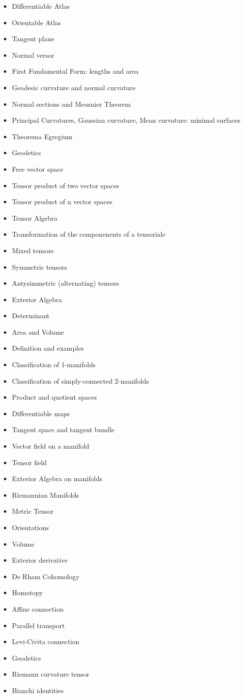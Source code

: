 \documentclass[10pt]{article}
\begin{document}
\begin{itemize}
	\item Differentiable Atlas
	\item Orientable Atlas
	\item Tangent plane
	\item Normal versor
	\item First Fundamental Form: lengths and area
	\item Geodesic curvature and normal curvature
	\item Normal sections and Meusnier Theorem
	\item Principal Curvatures, Gaussian curvature, Mean curvature: minimal surfaces
	\item Theorema Egregium
	\item Geodetics
	\item Free vector space
	\item Tensor product of two vector spaces
	\item Tensor product of n vector spaces
	\item Tensor Algebra
	\item Transformation of the componenents of a tensoriale
	\item Mixed tensors
	\item Symmetric tensors
	\item Antysimmetric (alternating) tensors
	\item Exterior Algebra
	\item Determinant
	\item Area and Volume
	\item Definition and examples
	\item Classification of 1-manifolds
	\item Classification of simply-connected 2-manifolds
	\item Product and quotient spaces
	\item Differentiable maps
	\item Tangent space and tangent bundle
	\item Vector field on a manifold
	\item Tensor field
	\item Exterior Algebra on manifolds
	\item Riemannian Manifolds
	\item Metric Tensor
	\item Orientations
	\item Volume
	\item Exterior derivative
	\item De Rham Cohomology
	\item Homotopy
	\item Affine connection
	\item Parallel transport
	\item Levi-Civita connection
	\item Geodetics
	\item Riemann curvature tensor
	\item Bianchi identities 
\end{itemize}
\end{document}
